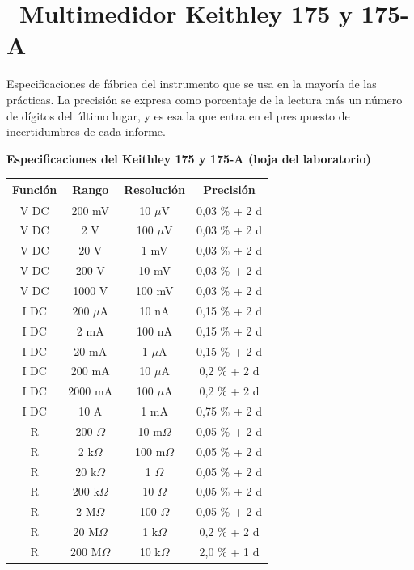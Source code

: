 \documentclass[11pt,a4paper]{article}
\newcommand{\iconotexto}[2]{\textcolor{cyanNeon}{\faIcon{#1}}~#2}
\begin{document}
\section{\iconotexto{paperclip}{Multimedidor Keithley 175 y 175-A}}

Especificaciones de fábrica del instrumento que se usa en la mayoría de las prácticas. La precisión se expresa como porcentaje de la lectura más un número de dígitos del último lugar, y es esa la que entra en el presupuesto de incertidumbres de cada informe.

\begin{center}
\begin{minipage}{\linewidth}
\centering
{\small
\textbf{Especificaciones del Keithley 175 y 175-A (hoja del laboratorio)}\par\smallskip
\begin{tabular}{@{}cccc@{}}
\toprule
Función & Rango & Resolución & Precisión \\
\midrule
V DC & 200 mV & 10 $\mu$V & 0,03 \% + 2 d \\
V DC & 2 V & 100 $\mu$V & 0,03 \% + 2 d \\
V DC & 20 V & 1 mV & 0,03 \% + 2 d \\
V DC & 200 V & 10 mV & 0,03 \% + 2 d \\
V DC & 1000 V & 100 mV & 0,03 \% + 2 d \\
I DC & 200 $\mu$A & 10 nA & 0,15 \% + 2 d \\
I DC & 2 mA & 100 nA & 0,15 \% + 2 d \\
I DC & 20 mA & 1 $\mu$A & 0,15 \% + 2 d \\
I DC & 200 mA & 10 $\mu$A & 0,2 \% + 2 d \\
I DC & 2000 mA & 100 $\mu$A & 0,2 \% + 2 d \\
I DC & 10 A & 1 mA & 0,75 \% + 2 d \\
R & 200 $\Omega$ & 10 m$\Omega$ & 0,05 \% + 2 d \\
R & 2 k$\Omega$ & 100 m$\Omega$ & 0,05 \% + 2 d \\
R & 20 k$\Omega$ & 1 $\Omega$ & 0,05 \% + 2 d \\
R & 200 k$\Omega$ & 10 $\Omega$ & 0,05 \% + 2 d \\
R & 2 M$\Omega$ & 100 $\Omega$ & 0,05 \% + 2 d \\
R & 20 M$\Omega$ & 1 k$\Omega$ & 0,2 \% + 2 d \\
R & 200 M$\Omega$ & 10 k$\Omega$ & 2,0 \% + 1 d \\
\bottomrule
\end{tabular}
}\par{}
\end{minipage}
\end{center}
\end{document}
